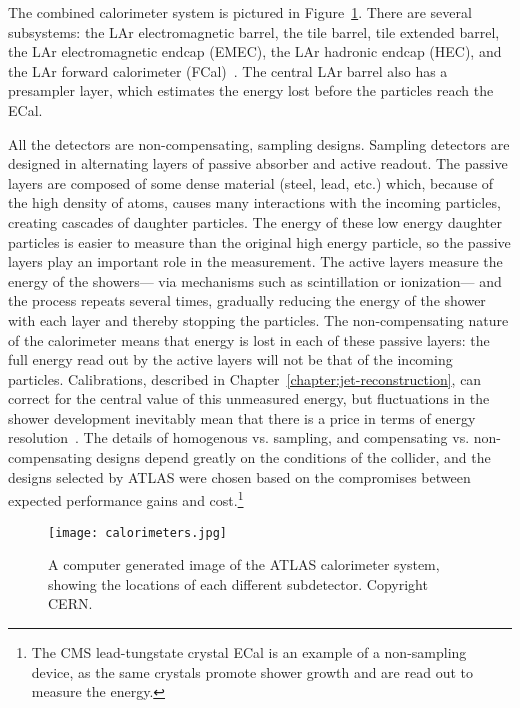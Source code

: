 The combined calorimeter system is pictured in Figure~\ref{fig:detector:calo}. There are several subsystems: the LAr electromagnetic barrel, the tile barrel, tile extended barrel, the LAr electromagnetic endcap (EMEC), the LAr hadronic endcap (HEC), and the LAr forward calorimeter (FCal)~\cite{ATLASPaper}. The central LAr barrel also has a presampler layer, which estimates the energy lost before the particles reach the ECal.

All the detectors are non-compensating, sampling designs. Sampling detectors are designed in alternating layers of passive absorber and active readout. The passive layers are composed of some dense material (steel, lead, etc.) which, because of the high density of atoms, causes many interactions with the incoming particles, creating cascades of daughter particles. The energy of these low energy daughter particles is easier to measure than the original high energy particle, so the passive layers play an important role in the measurement. The active layers measure the energy of the showers--- via mechanisms such as scintillation or ionization--- and the process repeats several times, gradually reducing the energy of the shower with each layer and thereby stopping the particles. The non-compensating nature of the calorimeter means that energy is lost in each of these passive layers: the full energy read out by the active layers will not be that of the incoming particles. Calibrations, described in Chapter~\ref{chapter:jet-reconstruction}, can correct for the central value of this unmeasured energy, but fluctuations in the shower development inevitably mean that there is a price in terms of energy resolution~\cite{Wigmans}. The details of homogenous vs. sampling, and compensating vs. non-compensating designs depend greatly on the conditions of the collider, and the designs selected by ATLAS were chosen based on the compromises between expected performance gains and cost.\footnote{The CMS lead-tungstate crystal ECal is an example of a non-sampling device, as the same crystals promote shower growth and are read out to measure the energy.}




\begin{figure}
\centering
\texttt{[image: calorimeters.jpg]}
\label{fig:detector:calo}
\caption{A computer generated image of the ATLAS calorimeter system, showing the locations of each different subdetector. Copyright CERN.}
\end{figure}

